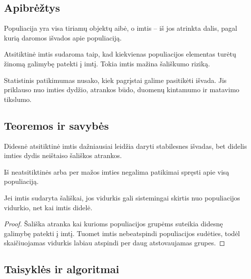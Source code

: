 \subsection{Apibrėžtys}

\begin{apibreztis}
Populiacija yra visa tiriamų objektų aibė, o imtis -- iš jos atrinkta dalis, pagal kurią daromos išvados apie populiaciją.
\end{apibreztis}

\begin{apibreztis}
Atsitiktinė imtis sudaroma taip, kad kiekvienas populiacijos elementas turėtų žinomą galimybę patekti į imtį. Tokia imtis mažina šališkumo riziką.
\end{apibreztis}

\begin{apibreztis}
Statistinis patikimumas nusako, kiek pagrįstai galime pasitikėti išvada. Jis priklauso nuo imties dydžio, atrankos būdo, duomenų kintamumo ir matavimo tikslumo.
\end{apibreztis}

\subsection{Teoremos ir savybės}

\begin{savybe}
Didesnė atsitiktinė imtis dažniausiai leidžia daryti stabilesnes išvadas, bet didelis imties dydis neištaiso šališkos atrankos.
\end{savybe}

\begin{savybe}
Iš neatsitiktinės arba per mažos imties negalima patikimai spręsti apie visą populiaciją.
\end{savybe}

\begin{teorema}
Jei imtis sudaryta šališkai, jos vidurkis gali sistemingai skirtis nuo populiacijos vidurkio, net kai imtis didelė.
\end{teorema}
\begin{proof}
Šališka atranka kai kurioms populiacijos grupėms suteikia didesnę galimybę patekti į imtį. Tuomet imtis nebeatspindi populiacijos sudėties, todėl skaičiuojamas vidurkis labiau atspindi per daug atstovaujamas grupes.
\end{proof}

\subsection{Taisyklės ir algoritmai}

